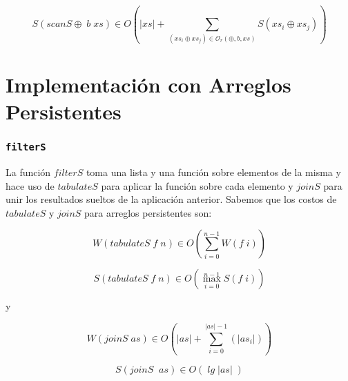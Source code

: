 \documentclass[a4paper,10pt]{article}
\begin{document}
\begin{equation*}
    S \left( scanS \oplus \; b \; xs \right) \in
    O \left( \vert xs \vert + \sum_{(xs_i \oplus xs_j) \in \mathcal{O}_r(\oplus,b,xs)} S \left( xs_i \oplus xs_j \right) \right)
\end{equation*}





\bigskip
\newpage{}





\part*{Implementación con Arreglos Persistentes}

\section*{\texttt{filterS}}

    La función $filterS$ toma una lista y una función sobre elementos de la misma
y hace uso de $tabulateS$ para aplicar la función sobre cada elemento y $joinS$ para
unir los resultados sueltos de la aplicación anterior.
    Sabemos que los costos de $tabulateS$ y $joinS$ para arreglos persistentes son:

\begin{equation*}
    W \left(tabulateS \;f \;n \right) \in
    O \left( \sum_{i=0}^{n-1} W \left( f\; i \right) \right)
\end{equation*}

\bigskip

\begin{equation*}
    S \left( tabulateS \;f \;n \right) \in
    O \left( \max_{i=0}^{n-1} S \left( f\; i \right) \right)
\end{equation*}

\smallskip
\begin{center}
y
\end{center}

\begin{equation*}
    W \left(joinS \;as\right) \in
    O \left( \vert as \vert + \sum_{i=0}^{\vert as \vert -1} \left( \vert as_i \vert \right) \right)
\end{equation*}

\begin{equation*}
    S \left(joinS\; \; as \right) \in
    O \left( \;lg \; \vert as \vert \; \right)
\end{equation*}
\end{document}
